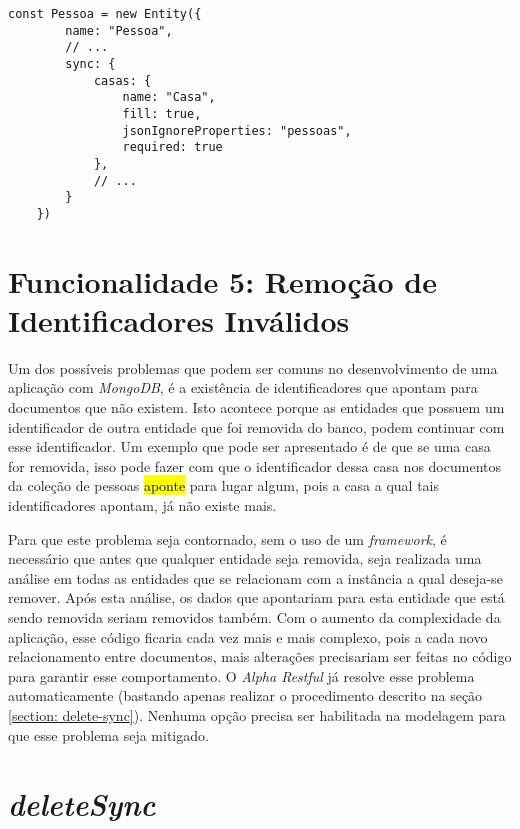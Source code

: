 \begin{lstlisting}[style=ES6, caption={Modelagem de Pessoa com \textit{required}\label{lst: required-alpha-restful}}]
    const Pessoa = new Entity({
        name: "Pessoa",
        // ...
        sync: {
            casas: {
                name: "Casa",
                fill: true,
                jsonIgnoreProperties: "pessoas",
                required: true
            },
            // ...
        }
    })
\end{lstlisting}

\section{Funcionalidade 5: Remoção de Identificadores Inválidos\label{section: identificadores-apontando-para-lixo}}

Um dos possíveis problemas que podem ser comuns no desenvolvimento de uma aplicação com \textit{MongoDB}, é a existência de identificadores que apontam para documentos que não existem. Isto acontece porque as entidades que possuem um identificador de outra entidade que foi removida do banco, podem continuar com esse identificador. Um exemplo que pode ser apresentado é de que se uma casa for removida, isso pode fazer com que o identificador dessa casa nos documentos da coleção de pessoas \hl{aponte} para lugar algum, pois a casa a qual tais identificadores apontam, já não existe mais.
    
Para que este problema seja contornado, sem o uso de um \textit{framework}, é necessário que antes que qualquer entidade seja removida, seja realizada uma análise em todas as entidades que se relacionam com a instância a qual deseja-se remover. Após esta análise, os dados que apontariam para esta entidade que está sendo removida seriam removidos também. Com o aumento da complexidade da aplicação, esse código ficaria cada vez mais e mais complexo, pois a cada novo relacionamento entre documentos, mais alterações precisariam ser feitas no código para garantir esse comportamento. O \textit{Alpha Restful} já resolve esse problema automaticamente (bastando apenas realizar o procedimento descrito na seção \ref{section: delete-sync}). Nenhuma opção precisa ser habilitada na modelagem para que esse problema seja mitigado.

\section{\textit{deleteSync\label{section: delete-sync}}}

